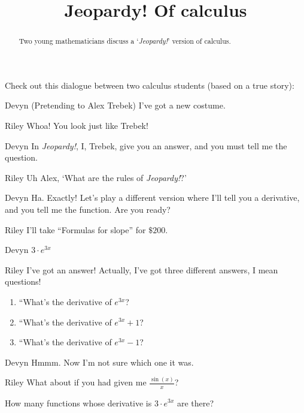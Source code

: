 \documentclass{ximera}
\title[Break-Ground:]{Jeopardy! Of calculus}
\begin{document}
\begin{abstract}
  Two young mathematicians discuss a `\textit{Jeopardy!}' version of calculus.
\end{abstract}
\maketitle

Check out this dialogue between two calculus students (based on a true story):

\begin{dialogue}
\item[Devyn] (Pretending to Alex Trebek) I've got a new costume.
\item[Riley] Whoa! You look just like Trebek!
\item[Devyn] In \textit{Jeopardy!}, I, Trebek, give you an answer, and you must tell me the question.
\item[Riley] Uh Alex, `What are the rules of \textit{Jeopardy!}?'
\item[Devyn] Ha. Exactly! Let's play a different version where I'll
  tell you a derivative, and you tell me the function.  Are you ready?
\item[Riley] I'll take ``Formulas for slope'' for $\$200$.
\item[Devyn] $3\cdot e^{3x}$  
\item[Riley] I've got an answer!  Actually, I've got three different
  answers, I mean questions!
  \begin{enumerate}
  \item ``What's the derivative of $e^{3x}$?
  \item ``What's the derivative of $e^{3x}+1$?
  \item ``What's the derivative of $e^{3x}-1$?
  \end{enumerate}
\item[Devyn] Hmmm. Now I'm not sure which one it was.
\item[Riley] What about if you had given me $\frac{\sin(x)}{x}$?
\end{dialogue}


\begin{problem}
  How many functions whose derivative is $3\cdot e^{3x}$ are there?
  \begin{prompt}
  \begin{multipleChoice}
  \end{multipleChoice}
  \end{prompt}
\end{problem}
\end{document}
